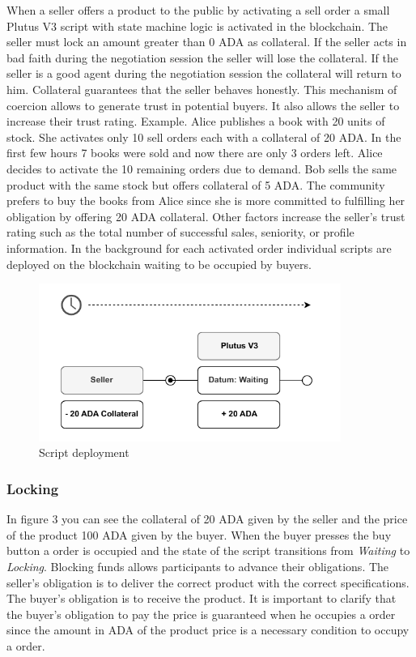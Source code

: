 \documentclass[12pt]{article}
\begin{document}
When a seller offers a product to the public by activating a sell order a small Plutus V3 script with state machine logic is activated in the blockchain.
The seller must lock an amount greater than 0 ADA as collateral. 
If the seller acts in bad faith during the negotiation session the seller will lose the collateral.
If the seller is a good agent during the negotiation session the collateral will return to him.
Collateral guarantees that the seller behaves honestly.
This mechanism of coercion allows to generate trust in potential buyers. 
It also allows the seller to increase their trust rating. Example. Alice publishes a book with 20 units of stock.
She activates only 10 sell orders each with a collateral of 20 ADA.
In the first few hours 7 books were sold and now there are only 3 orders left.
Alice decides to activate the 10 remaining orders due to demand.
Bob sells the same product with the same stock but offers collateral of 5 ADA. The community prefers to buy the books from Alice since she is more committed to fulfilling her obligation by offering 20 ADA collateral.
Other factors increase the seller's trust rating such as the total number of successful sales, seniority, or profile information.
In the background for each activated order individual scripts are deployed on the blockchain waiting to be occupied by buyers.

\begin{figure}[ht]
  \centering
  \includegraphics[width=0.88\textwidth, keepaspectratio]{1.pdf}
  \caption{Script deployment}
  \label{fig:mi_imagen}
\end{figure}


\subsubsection { Locking }

In figure 3 you can see the collateral of 20 ADA given by the seller and the price of the product 100 ADA given by the buyer.
When the buyer presses the buy button a order is occupied and the state of the script transitions from \emph{Waiting} to \emph{Locking}.
Blocking funds allows participants to advance their obligations.
The seller's obligation is to deliver the correct product with the correct specifications. The buyer's obligation is to receive the product.
It is important to clarify that the buyer's obligation to pay the price is guaranteed when he occupies a order since the amount in ADA of the product price is a necessary condition to occupy a order.
\end{document}
